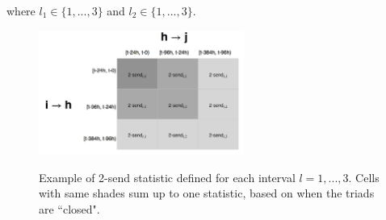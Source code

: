 where $l_1 \in \{1,...,3\}$ and $l_2 \in \{1,...,3\}$.
\begin{figure}[ht]
	\centering
	\includegraphics[width=0.6\textwidth]{plots/triadtable.jpg} 
	\label{fig:triadtable}
	\caption{Example of 2-send statistic defined for each interval $l=1,...,3$. Cells with same shades sum up to one statistic, based on when the triads are ``closed".}
\end{figure}
